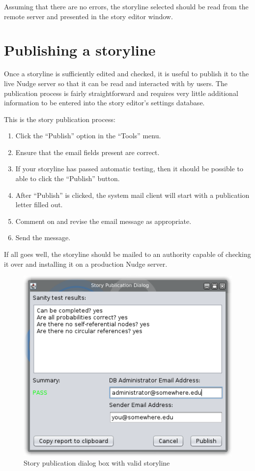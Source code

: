 \documentclass[12pt,letterpaper]{article}
\begin{document}
Assuming that there are no errors, the storyline selected should be read from the remote server and presented in the story editor
window.

\section{Publishing a storyline}
Once a storyline is sufficiently edited and checked, it is useful to publish it to the live Nudge server so that it can be
read and interacted with by users. The publication process is fairly straightforward and requires very little additional information
to be entered into the story editor's settings database. 

This is the story publication process:
\begin{enumerate}
\item Click the ``Publish'' option in the ``Tools'' menu.
\item Ensure that the email fields present are correct.
\item If your storyline has passed automatic testing, then it should be possible to able to click the ``Publish'' button.
\item After ``Publish'' is clicked, the system mail client will start with a publication letter filled out.
\item Comment on and revise the email message as appropriate.
\item Send the message.
\end{enumerate}

If all goes well, the storyline should be mailed to an authority capable of checking it over and installing it on a
production Nudge server. 

\begin{figure}
    \begin{center}
        \includegraphics[scale=1]{publicationbox.png}
    \end{center}
    \caption{Story publication dialog box with valid storyline}
\end{figure}
\end{document}
